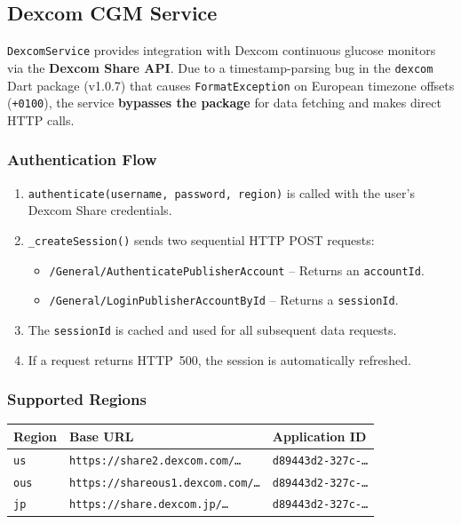 \documentclass[12pt,a4paper]{article}
\begin{document}
\subsection{Dexcom CGM Service}

\texttt{DexcomService} provides integration with Dexcom continuous glucose monitors via the \textbf{Dexcom Share API}. Due to a timestamp-parsing bug in the \texttt{dexcom} Dart package (v1.0.7) that causes \texttt{FormatException} on European timezone offsets (\texttt{+0100}), the service \textbf{bypasses the package} for data fetching and makes direct HTTP calls.

\subsubsection{Authentication Flow}
\begin{enumerate}
    \item \texttt{authenticate(username, password, region)} is called with the user's Dexcom Share credentials.
    \item \texttt{\_createSession()} sends two sequential HTTP POST requests:
    \begin{itemize}
        \item \texttt{/General/AuthenticatePublisherAccount} -- Returns an \texttt{accountId}.
        \item \texttt{/General/LoginPublisherAccountById} -- Returns a \texttt{sessionId}.
    \end{itemize}
    \item The \texttt{sessionId} is cached and used for all subsequent data requests.
    \item If a request returns HTTP~500, the session is automatically refreshed.
\end{enumerate}

\subsubsection{Supported Regions}
\begin{longtable}{p{2cm} p{6cm} p{5cm}}
\toprule
\textbf{Region} & \textbf{Base URL} & \textbf{Application ID} \\
\midrule
\texttt{us} & \texttt{https://share2.dexcom.com/\ldots} & \texttt{d89443d2-327c-\ldots} \\
\texttt{ous} & \texttt{https://shareous1.dexcom.com/\ldots} & \texttt{d89443d2-327c-\ldots} \\
\texttt{jp} & \texttt{https://share.dexcom.jp/\ldots} & \texttt{d89443d2-327c-\ldots} \\
\bottomrule
\end{longtable}
\end{document}
